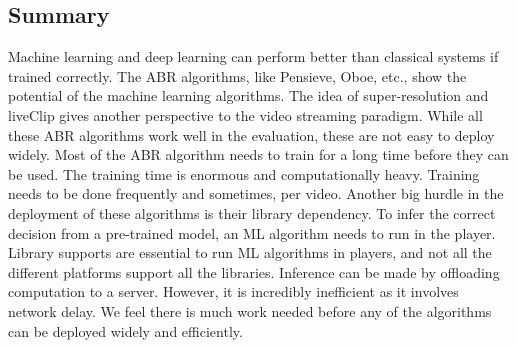 \subsection{Summary}
Machine learning and deep learning can perform better than classical systems if trained correctly. The ABR algorithms, like Pensieve, Oboe, etc., show the potential of the machine learning algorithms. The idea of super-resolution and liveClip gives another perspective to the video streaming paradigm. While all these ABR algorithms work well in the evaluation, these are not easy to deploy widely. Most of the ABR algorithm needs to train for a long time before they can be used. The training time is enormous and computationally heavy. Training needs to be done frequently and sometimes, per video. Another big hurdle in the deployment of these algorithms is their library dependency. To infer the correct decision from a pre-trained model, an ML algorithm needs to run in the player. Library supports are essential to run ML algorithms in players, and not all the different platforms support all the libraries. Inference can be made by offloading computation to a server. However, it is incredibly inefficient as it involves network delay. We feel there is much work needed before any of the algorithms can be deployed widely and efficiently.


